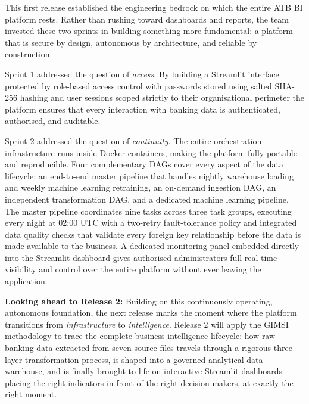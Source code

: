 This first release established the engineering bedrock on which the entire ATB BI
platform rests. Rather than rushing toward dashboards and reports, the team invested
these two sprints in building something more fundamental: a platform that is secure
by design, autonomous by architecture, and reliable by construction.

Sprint 1 addressed the question of \textit{access}. By building a Streamlit interface
protected by role-based access control with passwords stored using salted SHA-256
hashing and user sessions scoped strictly to their organisational perimeter the
platform ensures that every interaction with banking data is authenticated,
authorised, and auditable.

Sprint 2 addressed the question of \textit{continuity}. The entire orchestration
infrastructure runs inside Docker containers, making the platform fully portable and
reproducible. Four complementary DAGs cover every aspect of the data lifecycle:
an end-to-end master pipeline that handles nightly warehouse loading and weekly
machine learning retraining, an on-demand ingestion DAG, an independent transformation
DAG, and a dedicated machine learning pipeline. The master pipeline coordinates nine
tasks across three task groups, executing every night at 02:00 UTC with a two-retry
fault-tolerance policy and integrated data quality checks that validate every foreign
key relationship before the data is made available to the business. A dedicated
monitoring panel embedded directly into the Streamlit dashboard gives authorised
administrators full real-time visibility and control over the entire platform without
ever leaving the application.
 
\textbf{Looking ahead to Release 2:} Building on this continuously operating,
autonomous foundation, the next release marks the moment where the platform
transitions from \textit{infrastructure} to \textit{intelligence}. Release 2 will
apply the GIMSI methodology to trace the complete business intelligence lifecycle:
how raw banking data extracted from seven source files travels through a rigorous
three-layer transformation process, is shaped into a governed analytical data warehouse,
and is finally brought to life on interactive Streamlit dashboards placing the right
indicators in front of the right decision-makers, at exactly the right moment.